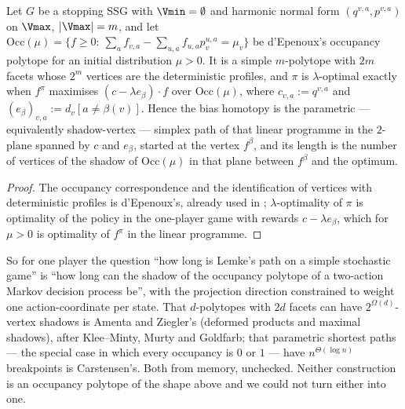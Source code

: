 \begin{proposition}\label{fsa:shadow}
Let $G$ be a stopping SSG with $\Vmin=\emptyset$ and harmonic normal form
$(q^{v,a},p^{v,a})$ on $\Vmax$, $|\Vmax|=m$, and let
$\mathrm{Occ}(\mu)=\{f\ge0:\ \sum_{a}f_{v,a}-\sum_{u,a}f_{u,a}p^{u,a}_v=\mu_v\}$
be d'Epenoux's occupancy polytope for an initial distribution $\mu>0$. It is
a simple $m$-polytope with $2m$ facets whose $2^{m}$ vertices are the
deterministic profiles, and $\pi$ is $\lambda$-optimal exactly when $f^{\pi}$
maximises $(c-\lambda e_\beta)\cdot f$ over $\mathrm{Occ}(\mu)$, where
$c_{v,a}:=q^{v,a}$ and $(e_\beta)_{v,a}:=d_v[a\ne\beta(v)]$. Hence the bias
homotopy is the parametric --- equivalently shadow-vertex --- simplex path of
that linear programme in the $2$-plane spanned by $c$ and $e_\beta$, started
at the vertex $f^{\beta}$, and its length is the number of vertices of the
shadow of $\mathrm{Occ}(\mu)$ in that plane between $f^{\beta}$ and the
optimum.
\end{proposition}

\begin{proof}
The occupancy correspondence and the identification of vertices with
deterministic profiles is d'Epenoux's, already used in
; $\lambda$-optimality of $\pi$ is optimality of the
policy in the one-player game with rewards $c-\lambda e_\beta$, which for
$\mu>0$ is optimality of $f^{\pi}$ in the linear programme.
\end{proof}

So for one player the question ``how long is Lemke's path on a simple
stochastic game'' is ``how long can the shadow of the occupancy polytope of a
two-action Markov decision process be'', with the projection direction
constrained to weight one action-coordinate per state. That $d$-polytopes
with $2d$ facets can have $2^{\Omega(d)}$-vertex shadows is Amenta and
Ziegler's (deformed products and maximal shadows), after Klee--Minty, Murty
and Goldfarb; that parametric shortest paths --- the special case in which
every occupancy is $0$ or $1$ --- have $n^{\Theta(\log n)}$ breakpoints is
Carstensen's. Both from memory, unchecked. Neither construction is an
occupancy polytope of the shape above and we could not turn either into one.

